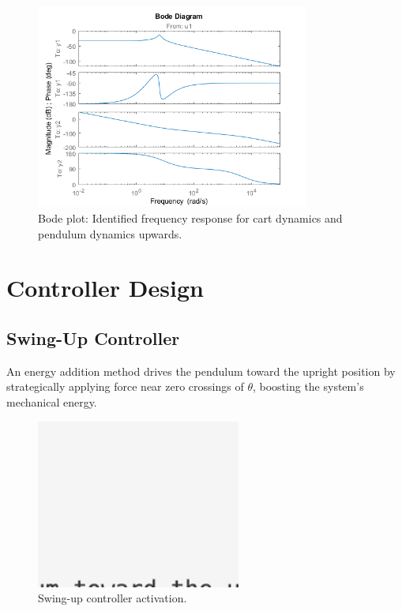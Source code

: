 \documentclass[12pt]{article}
\begin{document}
\begin{figure}[H]
    \centering
    \includegraphics[width=0.8\textwidth]{../plots/bode_up.png}
    \caption{Bode plot: Identified frequency response for cart dynamics and pendulum dynamics upwards.}
    \label{fig:bode_up}
\end{figure}


\section{Controller Design}

\subsection{Swing-Up Controller}
An energy addition method drives the pendulum toward the upright position by strategically applying force near zero crossings of $\theta$, boosting the system's mechanical energy.

\begin{figure}[H]
    \centering
    \includegraphics[width=0.6\textwidth]{figures/ph.png}
    \caption{Swing-up controller activation.}
    \label{fig:swingup}
\end{figure}
\end{document}
